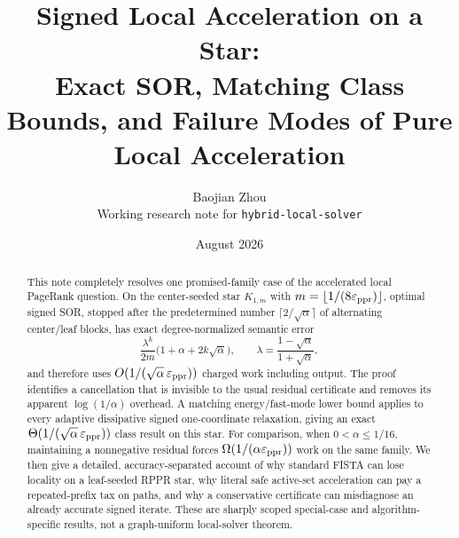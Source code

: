 \documentclass[11pt]{article}
\title{Signed Local Acceleration on a Star:\\
Exact SOR, Matching Class Bounds, and Failure Modes of Pure Local Acceleration}
\author{Baojian Zhou\\
\small Working research note for \texttt{hybrid-local-solver}}
\date{August 2026}
\begin{document}
\maketitle

\begin{abstract}
This note completely resolves one promised-family case of the accelerated
local PageRank question.  On the center-seeded star
$K_{1,m}$ with $m=\lfloor1/(8\varepsilon_{\rm ppr})\rfloor$, optimal signed
SOR, stopped after the predetermined number
$\lceil2/\sqrt\alpha\rceil$ of alternating center/leaf blocks, has exact
degree-normalized semantic error
\[
  \frac{\lambda^k}{2m}
  \bigl(1+\alpha+2k\sqrt\alpha\bigr),
  \qquad
  \lambda=\frac{1-\sqrt\alpha}{1+\sqrt\alpha},
\]
and therefore uses
$O(1/(\sqrt\alpha\,\varepsilon_{\rm ppr}))$ charged work including output.
The proof identifies a cancellation that is invisible to the usual residual
certificate and removes its apparent $\log(1/\alpha)$ overhead.  A matching
energy/fast-mode lower bound applies to every adaptive dissipative signed
one-coordinate relaxation, giving an exact
$\Theta(1/(\sqrt\alpha\,\varepsilon_{\rm ppr}))$ class result on this star.
For comparison, when $0<\alpha\leq1/16$, maintaining a nonnegative residual
forces $\Omega(1/(\alpha\varepsilon_{\rm ppr}))$ work on the same family.  We then
give a detailed, accuracy-separated account of why standard FISTA can lose
locality on a leaf-seeded RPPR star, why literal safe active-set acceleration
can pay a repeated-prefix tax on paths, and why a conservative certificate can
misdiagnose an already accurate signed iterate.  These are sharply scoped
special-case and algorithm-specific results, not a graph-uniform local-solver
theorem.
\end{abstract}













\end{document}
